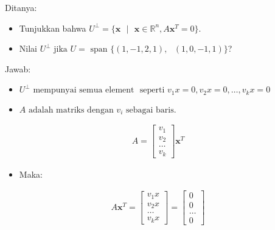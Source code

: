 \documentclass[12pt, a4paper]{scrartcl}
\begin{document}
\begin{enumerate}
\begin{enumerate}
                Ditanya:
                \begin{itemize}
                    \item Tunjukkan bahwa  $U^\perp = \{\textbf{x} \mbox{ }|\mbox{ } \textbf{x} \in \mathbb{R}^n, A\textbf{x}^T=0\}$.
                    \item Nilai $U^\perp \mbox{ jika }U = \mbox{ span } \{(1, -1, 2, 1), \mbox{ }(1, 0, -1, 1)\}$?
                \end{itemize}
            
                \pagebreak
            
                Jawab:
                \begin{itemize}
                    \item[] $U^\perp \mbox{ mempunyai semua element } \mbox{ seperti } v_1x=0, v_2x=0, \dots, v_kx=0$
                    \item[] $A \mbox{ adalah matriks dengan } v_i \mbox{ sebagai baris.}$ 
                \end{itemize}

                \begin{align*}
                    A = \begin{bmatrix}
                        v_1 \\ v_2 \\ \dots \\ v_k
                    \end{bmatrix} \textbf{x}^T
                \end{align*}

                \begin{itemize}
                    \item[] Maka:
                \end{itemize}

                \begin{align*}
                    A \textbf{x}^T = \begin{bmatrix}
                        v_1 x \\ v_2 x \\ \dots \\ v_k x
                    \end{bmatrix} = \begin{bmatrix}
                        0\\0\\\dots\\0
                    \end{bmatrix}
                \end{align*}


\end{enumerate}
\end{enumerate}
\end{document}
